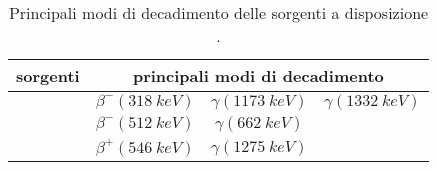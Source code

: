 \begin{table}[h]
	\centering
	\begin{tabular}{cccc}
		\toprule
		sorgenti & \multicolumn{3}{c}{principali modi di decadimento} \\
		\midrule
		\co & $\beta^{-} (\SI{318}{keV})$ & $\gamma (\SI{1173}{keV})$ & $\gamma (\SI{1332}{keV})$  \\
		\cs & $\beta^{-} (\SI{512}{keV})$ & $\gamma (\SI{662}{keV})$ \\
		\na & $\beta^{+} (\SI{546}{keV})$ & $\gamma (\SI{1275}{keV})$ \\
		\bottomrule
	\end{tabular}
	\caption{\label{tab:sorgenti_cal} Principali modi di decadimento delle sorgenti a disposizione \cite{2}.}
\end{table}
